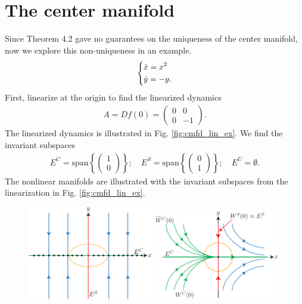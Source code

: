 \section{The center manifold}
\begin{ex}
	Since Theorem 4.2 gave no guarantees on the uniqueness of the center manifold, now we explore this non-uniqueness in an example.
	\begin{align}
\begin{dcases}
	\dot{x} = x^2 \\
	\dot{y} = -y.
\end{dcases}
	\end{align}
	First, linearize at the origin to find the linearized dynamics
	\begin{align}
		A = Df(0) = 
		\begin{pmatrix}
			0 & 0 \\ 0 & -1
		\end{pmatrix}
		.
	\end{align}
	The linearized dynamics is illustrated in Fig. \ref{fig:cmfd_lin_ex}. We find the invariant subspaces
	\begin{align}
		E^{C} =  \textrm{span}\left\{ 
			\begin{pmatrix}
				1 \\ 0 
			\end{pmatrix}
		\right\};\quad
		E^{S} =  \textrm{span}  \left\{
			\begin{pmatrix}
				0 \\ 1
			\end{pmatrix}
		\right\}; \quad
		E^{U} = \emptyset.
	\end{align}
	The nonlinear manifolds are illustrated with the invariant subspaces from the linearization in Fig. \ref{fig:cmfd_lin_ex}.
	\begin{figure}[h!]
		\centering
		\includegraphics[width=0.49\textwidth]{figures/ch3/2cmfd_lin_ex.pdf}
		\includegraphics[width=0.49\textwidth]{figures/ch3/3cmfd_nonlin_ex.pdf}

\end{figure}
\end{ex}
